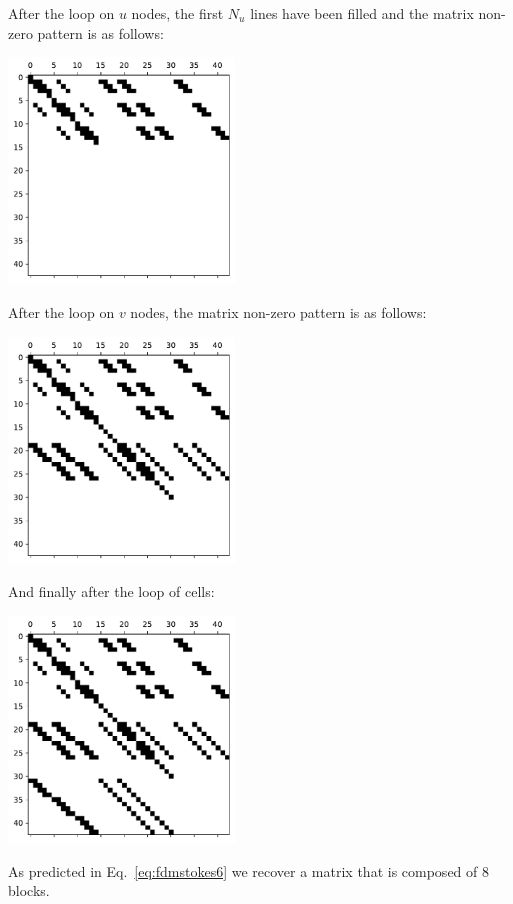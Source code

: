 After the loop on $u$ nodes, the first $N_u$ lines have been filled and the matrix non-zero pattern is as follows:
\begin{center}
\includegraphics[width=6cm]{python_codes/fieldstone_158/images/matrix_u.pdf}
\end{center}


After the loop on $v$ nodes, the matrix non-zero pattern is as follows:
\begin{center}
\includegraphics[width=6cm]{python_codes/fieldstone_158/images/matrix_uv.pdf}
\end{center}

And finally after the loop of cells:
\begin{center}
\includegraphics[width=6cm]{python_codes/fieldstone_158/images/matrix_uvp.pdf}
\end{center}
As predicted in Eq.~\eqref{eq:fdmstokes6} we recover a matrix that 
is composed of 8 blocks.




